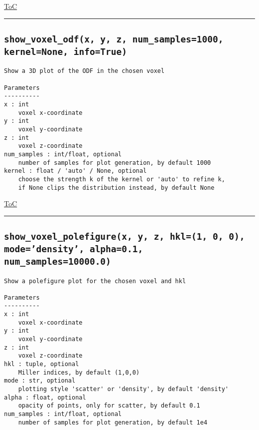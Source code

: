 \documentclass{article}
\begin{document}
\begin{flushright}

\hyperref[toc]{ToC}

\end{flushright}



\vspace{5mm}

\hrule

\subsection*{\texttt{show\_voxel\_odf(x, y, z, num\_samples=1000, kernel=None, info=True)}}
\label{fun:showvoxelodf}

\begin{lstlisting}[language=docstring]
Show a 3D plot of the ODF in the chosen voxel

Parameters
----------
x : int
    voxel x-coordinate
y : int
    voxel y-coordinate
z : int
    voxel z-coordinate
num_samples : int/float, optional
    number of samples for plot generation, by default 1000
kernel : float / 'auto' / None, optional
    choose the strength k of the kernel or 'auto' to refine k,
    if None clips the distribution instead, by default None
\end{lstlisting}

\begin{flushright}

\hyperref[toc]{ToC}

\end{flushright}



\vspace{5mm}

\hrule

\subsection*{\texttt{show\_voxel\_polefigure(x, y, z, hkl=(1, 0, 0), mode='density', alpha=0.1, num\_samples=10000.0)}}
\label{fun:showvoxelpolefigure}

\begin{lstlisting}[language=docstring]
Show a polefigure plot for the chosen voxel and hkl

Parameters
----------
x : int
    voxel x-coordinate
y : int
    voxel y-coordinate
z : int
    voxel z-coordinate
hkl : tuple, optional
    Miller indices, by default (1,0,0)
mode : str, optional
    plotting style 'scatter' or 'density', by default 'density'
alpha : float, optional
    opacity of points, only for scatter, by default 0.1
num_samples : int/float, optional
    number of samples for plot generation, by default 1e4
\end{lstlisting}
\end{document}
